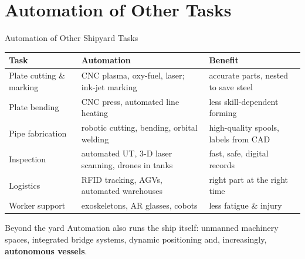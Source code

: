 \documentclass[aspectratio=169]{beamer}
\begin{document}
	\section{Automation of Other Tasks}
	\begin{frame}{Automation of Other Shipyard Tasks}
		\renewcommand{\arraystretch}{1.08}
		\centering
		\footnotesize
		\begin{tabular}{@{}>{\raggedright}p{2.8cm}>{\raggedright}p{5.0cm}>{\raggedright\arraybackslash}p{4.8cm}@{}}
			\toprule
			\textbf{Task} & \textbf{Automation} & \textbf{Benefit} \\
			\midrule
			Plate cutting \& marking & CNC plasma, oxy-fuel, laser; ink-jet marking & accurate parts, nested to save steel \\
			Plate bending   & CNC press, automated line heating         & less skill-dependent forming \\
			Pipe fabrication & robotic cutting, bending, orbital welding & high-quality spools, labels from CAD \\
			Inspection      & automated UT, 3-D laser scanning, drones in tanks & fast, safe, digital records \\
			Logistics       & RFID tracking, AGVs, automated warehouses & right part at the right time \\
			Worker support  & exoskeletons, AR glasses, cobots          & less fatigue \& injury \\
			\bottomrule
		\end{tabular}
		\vspace{0.1cm}
		\begin{block}{Beyond the yard}
			\small Automation also runs the ship itself: unmanned machinery spaces, integrated bridge systems, dynamic positioning and, increasingly, \textbf{autonomous vessels}.
		\end{block}
	\end{frame}
\end{document}
